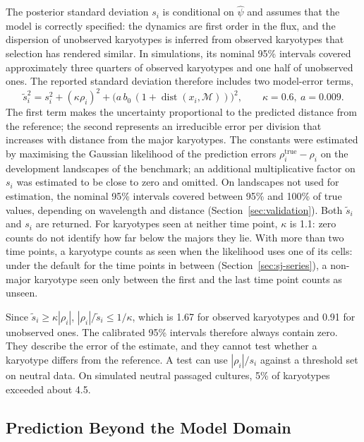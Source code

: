 \documentclass[11pt]{article}
\begin{document}
The posterior standard deviation $s_i$ is conditional on $\hat\psi$ and
assumes that the model is correctly specified: the dynamics are first order in
the flux, and the dispersion of unobserved karyotypes is inferred from
observed karyotypes that selection has rendered similar. In simulations, its
nominal 95\% intervals covered approximately three quarters of observed
karyotypes and one half of unobserved ones. The reported standard deviation
therefore includes two model-error terms,
\begin{equation}
  \tilde s_i^2=s_i^2+(\kappa\rho_i)^2+\bigl(a\,b_0\,(1+\operatorname{dist}(x_i,\mathcal{M}))\bigr)^2,
  \qquad \kappa=0.6,\ a=0.009.
  \label{eq:calibration}
\end{equation}
The first term makes the uncertainty proportional to the predicted distance
from the reference; the second represents an irreducible error per division
that increases with distance from the major karyotypes. The constants were
estimated by maximising the Gaussian likelihood of the prediction errors
$\rho_i^{\mathrm{true}}-\rho_i$ on the development landscapes of the
benchmark; an additional multiplicative factor on $s_i$ was estimated to be
close to zero and omitted. On landscapes not used for estimation, the nominal
95\% intervals covered between 95\% and 100\% of true values, depending on
wavelength and distance (Section~\ref{sec:validation}). Both $\tilde s_i$ and
$s_i$ are returned. For karyotypes seen at neither time point, $\kappa$ is 1.1:
zero counts do not identify how far below the majors they lie. With more than
two time points, a karyotype counts as seen when the likelihood uses one of
its cells: under the default for the time points in between
(Section~\ref{sec:sj-series}), a non-major karyotype seen only between the
first and the last time point counts as unseen.

Since $\tilde s_i\ge\kappa|\rho_i|$, $|\rho_i|/\tilde s_i\le1/\kappa$, which is
1.67 for observed karyotypes and 0.91 for unobserved ones. The calibrated
95\% intervals therefore always contain zero. They describe the error of the
estimate, and they cannot test whether a karyotype differs from the
reference. A test can use $|\rho_i|/s_i$ against a threshold set on neutral
data. On simulated neutral passaged cultures, 5\% of karyotypes exceeded
about 4.5.

\subsection{Prediction Beyond the Model Domain}
\label{sec:sj-predict}
\end{document}
